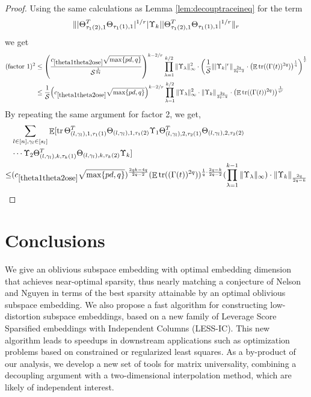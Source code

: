 \documentclass[11pt]{amsart}
\numberwithin{equation}{section}
\numberwithin{equation}{section}
\DeclareMathOperator{\E}{\mathbb{E}}
\DeclareMathOperator*{\tr}{tr}
\newcommand{\cS}{\mathcal{S}}
\DeclarePairedDelimiter{\norm}{\lVert}{\rVert}
\DeclarePairedDelimiter{\paren}{(}{)}
\theoremstyle{remark}
\theoremstyle{definition}
\begin{document}
\begin{proof}
Using the same calculations as Lemma \ref{lem:decouptraceineq} for the term \begin{align*}\norm{|\Theta_{\tau_{1}(2),1}^T\Theta_{\tau_{1}(1),1}|^{1/r} |\Upsilon_k| |\Theta_{\tau_{1}(2),1}^T\Theta_{\tau_{1}(1),1}|^{1/r}}_r\end{align*} we get 
\begin{align*}
    (\text{factor 1})^2
 &\le  \paren*{\frac{ c_{\ref*{theta1theta2ose}}\sqrt{\max \{ pd, q \}} }{\mathcal{S}^\frac{1}{2q}}}^{k-2/r}\prod\limits_{\lambda  = 1}^{k/2} {\norm{\Upsilon_\lambda }_{\infty}^2} \cdot  \paren*{\frac{1}{\cS} \norm{|\Upsilon_k|^{r}}_{\frac{2q}{2q-2}} \cdot \paren*{\E \tr((\Gamma(t))^{2q})}^\frac{1}{q}}^\frac{1}{r} \\
 &\le \frac{1}{\cS} \paren*{ c_{\ref*{theta1theta2ose}}\sqrt{\max \{ pd, q \}}  }^{k-2/r}\prod\limits_{\lambda  = 1}^{k/2} {\norm{\Upsilon_\lambda }_{\infty}^2} \cdot   \norm{\Upsilon_k}_{\frac{2q}{2q-k}} \cdot \paren*{\E \tr((\Gamma(t))^{2q})}^\frac{1}{qr}  \\
\end{align*}
By repeating the same argument for factor 2, we get,
\begin{align*}
    &\sum_{l \in [n], \gamma_l \in [s_l]} \E[ \tr \Theta_{(l,\gamma_l), 1, \tau_1(1)}^T\Theta_{(l,\gamma_l), 1, \tau_1(2)}
	\Upsilon_1\Theta_{(l,\gamma_l), 2, \tau_2(1)}^T\Theta_{(l,\gamma_l), 2, \tau_2(2)} \\&\cdots
	\Upsilon_2\Theta_{(l,\gamma_l), k, \tau_k(1)}^T\Theta_{(l,\gamma_l), k, \tau_k(2)}\Upsilon_k]  \\ \le &
       (c_{\ref*{theta1theta2ose}}\sqrt{\max \{ pd, q \}})^{\frac{2qk-4q}{2q-2}} (\E \tr((\Gamma(t))^{2q}))^{\frac{1}{q} \cdot \frac{2q-k}{2q-2}} ({\prod\limits_{\lambda  = 1}^{k-1} {\norm{\Upsilon_\lambda }_{\infty}} )\cdot \norm{\Upsilon_k}_{\frac{2q}{2q-k}}}
\end{align*}

\end{proof} 
\section{Conclusions}

We give an oblivious subspace embedding with optimal embedding dimension that achieves near-optimal sparsity, thus nearly matching a conjecture of Nelson and Nguyen in terms of the best sparsity attainable by an optimal oblivious subspace embedding. We also propose a fast algorithm for constructing low-distortion subspace embeddings, based on a new family of Leverage Score Sparsified embeddings with Independent Columns (LESS-IC). This new algorithm leads to speedups in downstream applications such as optimization problems based on constrained or regularized least squares. As a by-product of our analysis, we develop a new set of tools for matrix universality, combining a decoupling argument with a two-dimensional interpolation method, which are likely of independent interest. 


\printbibliography
\end{document}
